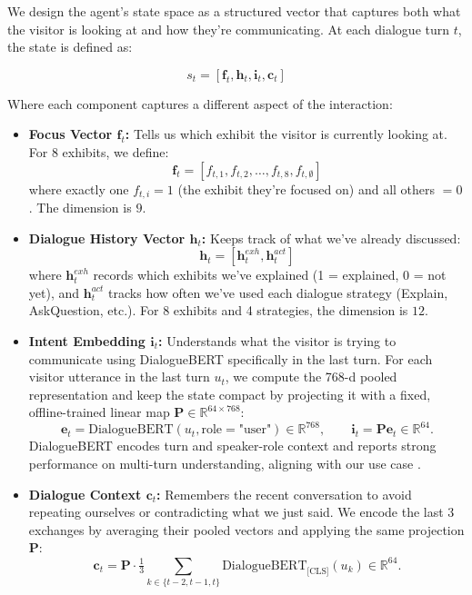\documentclass[12pt]{article}
\begin{document}
We design the agent's state space as a structured vector that captures both what the visitor is looking at and how they're communicating. At each dialogue turn $t$, the state is defined as:

\[
s_t = [\mathbf{f}_t, \mathbf{h}_t, \mathbf{i}_t, \mathbf{c}_t]
\]

Where each component captures a different aspect of the interaction:

\begin{itemize}
  \item \textbf{Focus Vector $\mathbf{f}_t$:} Tells us which exhibit the visitor is currently looking at. For 8 exhibits, we define:
  \[
  \mathbf{f}_t = [f_{t,1}, f_{t,2}, \ldots, f_{t,8}, f_{t,\emptyset}]
  \]
  where exactly one $f_{t,i} = 1$ (the exhibit they're focused on) and all others $= 0$. The dimension is $9$.
  
  \item \textbf{Dialogue History Vector $\mathbf{h}_t$:} Keeps track of what we've already discussed:
  \[
  \mathbf{h}_t = [\mathbf{h}_t^{exh}, \mathbf{h}_t^{act}]
  \]
  where $\mathbf{h}_t^{exh}$ records which exhibits we've explained (1 = explained, 0 = not yet), and $\mathbf{h}_t^{act}$ tracks how often we've used each dialogue strategy (Explain, AskQuestion, etc.). For 8 exhibits and 4 strategies, the dimension is $12$.

  \item \textbf{Intent Embedding $\mathbf{i}_t$:} Understands what the visitor is trying to communicate using DialogueBERT \citep{zhang2021dialoguebert} specifically in the last turn. For each visitor utterance in the last turn $u_t$, we compute the 768-d pooled representation and keep the state compact by projecting it with a fixed, offline-trained linear map $\mathbf{P}\in\mathbb{R}^{64\times 768}$:
  \[
  \mathbf{e}_t = \text{DialogueBERT}(u_t,\text{role}=\text{"user"})\in\mathbb{R}^{768},\qquad
  \mathbf{i}_t = \mathbf{P}\mathbf{e}_t \in \mathbb{R}^{64}.
  \]
  DialogueBERT encodes turn and speaker-role context and reports strong performance on multi-turn understanding, aligning with our use case \citep{zhang2021dialoguebert}.

  \item \textbf{Dialogue Context $\mathbf{c}_t$:} Remembers the recent conversation to avoid repeating ourselves or contradicting what we just said. We encode the last 3 exchanges by averaging their pooled vectors and applying the same projection $\mathbf{P}$:
  \[
  \mathbf{c}_t = \mathbf{P}\cdot \tfrac{1}{3}\sum_{k\in\{t-2,t-1,t\}}\text{DialogueBERT}_{\text{[CLS]}}(u_k) \in \mathbb{R}^{64}.
  \]
\end{itemize}
\end{document}
